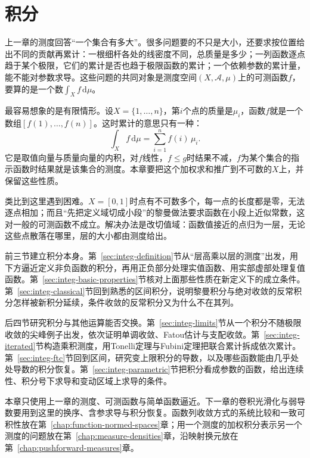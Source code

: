 \chapter{积分}
\label{chap:integration}

上一章的测度回答“一个集合有多大”。很多问题要的不只是大小，还要求按位置给出不同的贡献再累计：一根细杆各处的线密度不同，总质量是多少；一列函数逐点趋于某个极限，它们的累计是否也趋于极限函数的累计；一个依赖参数的累计量，能不能对参数求导。这些问题的共同对象是测度空间$(X,\mathcal A,\mu)$上的可测函数$f$，要算的是一个数$\int_Xf\,\mathrm d\mu$。

最容易想象的是有限情形。设$X=\{1,\dots,n\}$，第$i$个点的质量是$\mu_i$，函数$f$就是一个数组$[f(1),\dots,f(n)]$。这时累计的意思只有一种：
\[
 \int_Xf\,\mathrm d\mu=\sum_{i=1}^nf(i)\,\mu_i .
\]
它是取值向量与质量向量的内积，对$f$线性，$f\leq g$时结果不减，$f$为某个集合的指示函数时结果就是该集合的测度。本章要把这个加权求和推广到不可数的$X$上，并保留这些性质。

类比到这里遇到困难。$X=[0,1]$时点有不可数多个，每一点的长度都是零，无法逐点相加；而且“先把定义域切成小段”的黎曼做法要求函数在小段上近似常数，这对一般的可测函数不成立。解决办法是改切值域：函数值接近的点归为一层，无论这些点散落在哪里，层的大小都由测度给出。

前三节建立积分本身。第~\ref{sec:integ-definition}节从“层高乘以层的测度”出发，用下方逼近定义非负函数的积分，再用正负部分处理实值函数、用实部虚部处理复值函数。第~\ref{sec:integ-basic-properties}节核对上面那些性质在新定义下的成立条件。第~\ref{sec:integ-classical}节回到熟悉的区间积分，说明黎曼积分与绝对收敛的反常积分怎样被新积分延续，条件收敛的反常积分又为什么不在其列。

后四节研究积分与其他运算能否交换。第~\ref{sec:integ-limits}节从一个积分不随极限收敛的尖峰例子出发，依次证明单调收敛、Fatou估计与支配收敛。第~\ref{sec:integ-iterated}节构造乘积测度，用Tonelli定理与Fubini定理把联合累计拆成依次累计。第~\ref{sec:integ-ftc}节回到区间，研究变上限积分的导数，以及哪些函数能由几乎处处导数的积分恢复。第~\ref{sec:integ-parametric}节把积分看成参数的函数，给出连续性、积分号下求导和变动区域上求导的条件。

本章只使用上一章的测度、可测函数与简单函数逼近。下一章的卷积光滑化与弱导数要用到这里的换序、含参求导与积分恢复。函数列收敛方式的系统比较和一致可积性放在第~\ref{chap:function-normed-spaces}章；用一个测度的加权积分表示另一个测度的问题放在第~\ref{chap:measure-densities}章，沿映射换元放在第~\ref{chap:pushforward-measures}章。









